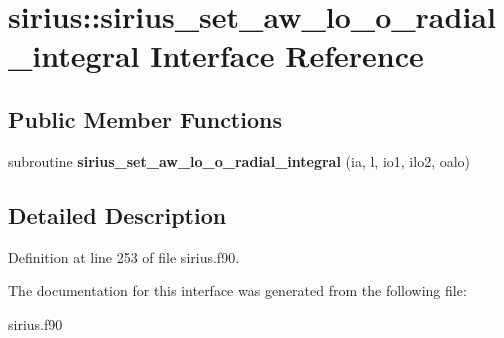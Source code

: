 \hypertarget{interfacesirius_1_1sirius__set__aw__lo__o__radial__integral}{}\section{sirius\+:\+:sirius\+\_\+set\+\_\+aw\+\_\+lo\+\_\+o\+\_\+radial\+\_\+integral Interface Reference}
\label{interfacesirius_1_1sirius__set__aw__lo__o__radial__integral}
\subsection*{Public Member Functions}
\begin{DoxyCompactItemize}
\item 
\hypertarget{interfacesirius_1_1sirius__set__aw__lo__o__radial__integral_ad290afc23a0fe1ca0fc739b73242740b}{}subroutine {\bfseries sirius\+\_\+set\+\_\+aw\+\_\+lo\+\_\+o\+\_\+radial\+\_\+integral} (ia, l, io1, ilo2, oalo)\label{interfacesirius_1_1sirius__set__aw__lo__o__radial__integral_ad290afc23a0fe1ca0fc739b73242740b}

\end{DoxyCompactItemize}


\subsection{Detailed Description}


Definition at line 253 of file sirius.\+f90.



The documentation for this interface was generated from the following file\+:\begin{DoxyCompactItemize}
\item 
sirius.\+f90\end{DoxyCompactItemize}

